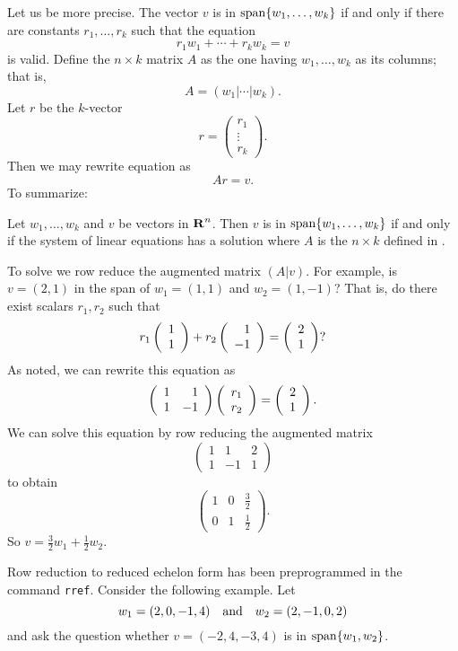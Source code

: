 \documentclass{ximera}
\begin{document}
Let us be more precise.  The vector $v$ is in
${\rm span}\{w_1,\ldots,w_k\}$ if and only if there are constants
$r_1,\ldots,r_k$ such that the equation
\begin{equation}  \label{e:lindepeqn}
     r_1 w_1 + \cdots + r_k w_k = v
\end{equation}
is valid.  Define the $n\times k$ matrix $A$ as the one having
$w_1,\ldots,w_k$ as its columns; that is,
\begin{equation}  \label{E:Abycol}
A = (w_1| \cdots |w_k).
\end{equation}
Let  $r$ be the $k$-vector
\[
r= \left(\begin{array}{c} r_1 \\ \vdots \\ r_k\end{array}\right).
\]
Then we may rewrite equation  as
\begin{equation}  \label{E:Ar=v}
   Ar=v.
\end{equation}
To summarize:
\begin{lemma}
Let $w_1,\ldots,w_k$ and $v$ be vectors in $\mbox{$\bf{R}$}^n$.  Then $v$
is in ${\rm span}\{w_1,\ldots,w_k\}$ if and only if the system of linear
equations  has a solution where $A$ is the $n\times k$
defined in .
\end{lemma}

To solve  we row reduce the
augmented matrix $(A|v)$.
For example, is $v=(2,1)$ in the span of $w_1=(1,1)$ and $w_2=(1,-1)$?
That is, do there exist scalars $r_1,r_2$ such that
\[
r_1\left(\begin{array}{r} 1 \\ 1\end{array}\right) + r_2\left(\begin{array}{r} 1 \\ -1\end{array}\right) = \left(\begin{array}{r} 2 \\ 1\end{array}\right)?
\]
As noted, we can rewrite this equation as
\[
\left(\begin{array}{rr} 1 & 1\\ 1 &-1\end{array}\right)\left(\begin{array}{r} r_1 \\ r_2\end{array}\right) = \left(\begin{array}{r} 2 \\ 1\end{array}\right).
\]
We can solve this equation by row reducing the augmented
matrix
\[
\left(\begin{array}{rr|r}
1 & 1 & 2 \\ 1 & -1 & 1 \end{array}\right)
\]
to obtain
\[
\left(\begin{array}{rr|r}
1 & 0 & \frac{3}{2} \\ 0 & 1 & \frac{1}{2}
\end{array}\right).
\]
So $v = \frac{3}{2}w_1 + \frac{1}{2}w_2$.

Row reduction to reduced echelon form
has been preprogrammed in the
\Matlab command {\tt rref}.   Consider the
following example.  Let
\begin{equation}  \label{e:w1w2}
     w_1=(2,0,-1,4) \quad\mbox{and}\quad w_2=(2,-1,0,2)
\end{equation}
and ask the question whether $v=(-2,4,-3,4)$ is in ${\rm span}\{w_1,w_2\}$.
\end{document}
